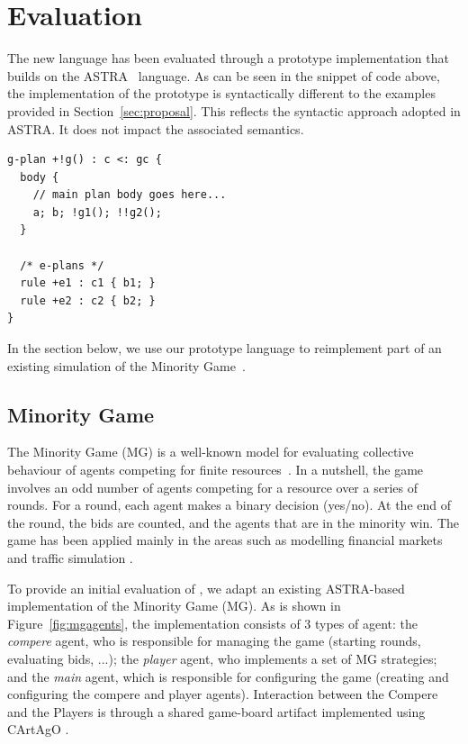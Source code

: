 \section{Evaluation}
\label{sec:evaluation}
The new language has been evaluated through a prototype implementation that builds on 
the ASTRA~\cite{DBLP:conf/prima/CollierRL15} language.  As can be seen in the  snippet 
of code above, the implementation of the {\aser} prototype is syntactically different 
to the examples provided in Section~\ref{sec:proposal}. This reflects the syntactic 
approach adopted in ASTRA. It does not impact the associated semantics.

{\small
\begin{verbatim}
g-plan +!g() : c <: gc { 
  body {
    // main plan body goes here...
    a; b; !g1(); !!g2();
  }

  /* e-plans */
  rule +e1 : c1 { b1; }
  rule +e2 : c2 { b2; }
}
\end{verbatim}}

In the section below, we use our prototype language to reimplement part of an existing 
simulation of the Minority Game~\cite{moro2004minority}.

\subsection{Minority Game}
\label{minority}
The Minority Game (MG) is a well-known model for evaluating collective behaviour of agents competing 
for finite resources~\cite{moro2004minority}. In a nutshell, the game involves an odd number of
agents competing for a resource over a series of rounds. For a round, each agent makes a binary
decision (yes/no). At the end of the round, the bids are counted, and the agents that are in the
minority win. The game has been applied mainly in the areas such as modelling financial markets 
\cite{challet2013minority} and traffic simulation \cite{chmura2004minority}.

To provide an initial evaluation of {\aser}, we adapt an existing ASTRA-based implementation of 
the Minority Game (MG). As is shown in Figure~\ref{fig:mgagents}, the implementation consists of
3 types of agent: the \emph{compere} agent, who is responsible for managing the game (starting 
rounds, evaluating bids, ...); the \emph{player} agent, who implements a set of MG strategies; 
and the \emph{main} agent, which is responsible for configuring the game (creating and configuring
the compere and player agents). Interaction between the Compere and the Players is through a shared 
game-board artifact implemented using CArtAgO \cite{...}.

